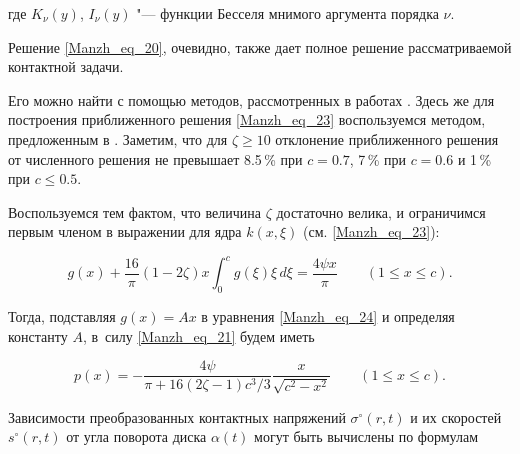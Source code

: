 где $K_\nu(y)$, $I_\nu(y)$ "--- функции Бесселя мнимого аргумента порядка $\nu$.



Решение \eqref{Manzh_eq_20}, очевидно, также дает полное решение рассматриваемой контактной задачи. 

Его можно найти с помощью методов, рассмотренных в работах \cite{Manzh_bib_16,Manzh_bib_17}. Здесь же для построения приближенного решения \eqref{Manzh_eq_23} воспользуемся методом, предложенным в \cite{Manzh_bib_10}. Заметим, что для $\zeta\geq10$ отклонение приближенного решения от численного решения не превышает 8.5\,\% при $c=0.7$,  7\,\% при $c=0.6$ и 1\,\% при $c\leq0.5$.



Воспользуемся тем фактом, что величина $\zeta$ достаточно велика, и ограничимся первым членом в выражении для ядра $k(x,\xi)$ (см. \eqref{Manzh_eq_23}):

\begin{equation}\label{Manzh_eq_24}%

  g(x)+\frac{16}\pi(1-2\zeta)x\!\int_0^c g(\xi)\xi\,d\xi=\frac{4\psi x}\pi\qquad

  (1\leq x\leq c).

\end{equation}

Тогда, подставляя $g(x)=Ax$ в уравнения \eqref{Manzh_eq_24} и определяя константу $A$, в~силу \eqref{Manzh_eq_21} будем иметь 

\begin{equation}\label{Manzh_eq_25}%

  p(x)=-\frac{4\psi}{\pi + 16(2\zeta - 1)c^3 /3}\frac{x}{\sqrt{c^2 - x^2}}\qquad    (1\leq x\leq c).

\end{equation}



Зависимости преобразованных контактных напряжений $\sigma^\circ(r,t)$ и их скоростей $s^\circ(r,t)$ от угла поворота диска $\alpha(t)$ могут быть вычислены по формулам

